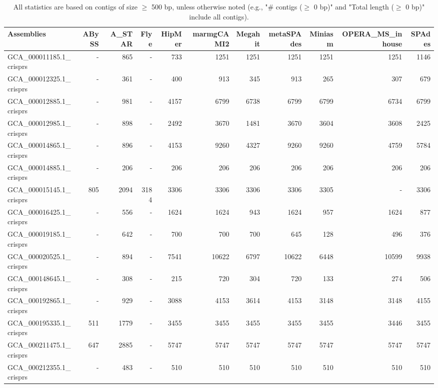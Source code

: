 \documentclass[12pt,a4paper]{article}
\begin{document}
\begin{table}[ht]
\begin{center}
\caption{All statistics are based on contigs of size $\geq$ 500 bp, unless otherwise noted (e.g., "\# contigs ($\geq$ 0 bp)" and "Total length ($\geq$ 0 bp)" include all contigs).}
\begin{tabular}{|l*{10}{|r}|}
\hline
Assemblies & ABySS & A\_STAR & Flye & HipMer & marmgCAMI2 & Megahit & metaSPAdes & Miniasm & OPERA\_MS\_inhouse & SPAdes \\ \hline
GCA\_000011185.1\_crisprs & - & 865 & - & 733 & 1251 & 1251 & 1251 & 1251 & 1251 & 1146 \\ \hline
GCA\_000012325.1\_crisprs & - & 361 & - & 400 & 913 & 345 & 913 & 265 & 307 & 679 \\ \hline
GCA\_000012885.1\_crisprs & - & 981 & - & 4157 & 6799 & 6738 & 6799 & 6799 & 6734 & 6799 \\ \hline
GCA\_000012985.1\_crisprs & - & 898 & - & 2492 & 3670 & 1481 & 3670 & 3604 & 3608 & 2425 \\ \hline
GCA\_000014865.1\_crisprs & - & 896 & - & 4153 & 9260 & 4327 & 9260 & 9260 & 4759 & 5784 \\ \hline
GCA\_000014885.1\_crisprs & - & 206 & - & 206 & 206 & 206 & 206 & 206 & 206 & 206 \\ \hline
GCA\_000015145.1\_crisprs & 805 & 2094 & 3184 & 3306 & 3306 & 3306 & 3306 & 3305 & - & 3306 \\ \hline
GCA\_000016425.1\_crisprs & - & 556 & - & 1624 & 1624 & 943 & 1624 & 957 & 1624 & 877 \\ \hline
GCA\_000019185.1\_crisprs & - & 642 & - & 700 & 700 & 700 & 645 & 128 & 496 & 376 \\ \hline
GCA\_000020525.1\_crisprs & - & 894 & - & 7541 & 10622 & 6797 & 10622 & 6448 & 10599 & 9938 \\ \hline
GCA\_000148645.1\_crisprs & - & 308 & - & 215 & 720 & 304 & 720 & 133 & 274 & 506 \\ \hline
GCA\_000192865.1\_crisprs & - & 929 & - & 3088 & 4153 & 3614 & 4153 & 3148 & 3148 & 4155 \\ \hline
GCA\_000195335.1\_crisprs & 511 & 1779 & - & 3455 & 3455 & 3455 & 3455 & 3455 & 3446 & 3455 \\ \hline
GCA\_000211475.1\_crisprs & 647 & 2885 & - & 5747 & 5747 & 5747 & 5747 & 5747 & 5747 & 5747 \\ \hline
GCA\_000212355.1\_crisprs & - & 483 & - & 510 & 510 & 510 & 510 & 510 & 510 & 510 \\ \hline

\end{tabular}
\end{center}
\end{table}
\end{document}
